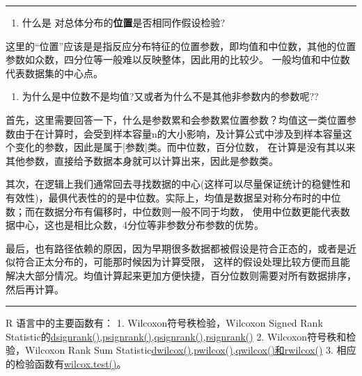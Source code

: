 \documentclass[
]{article}
\providecommand{\tightlist}{%
  \setlength{\itemsep}{0pt}\setlength{\parskip}{0pt}}
\begin{document}
\begin{center}\rule{0.5\linewidth}{0.5pt}\end{center}

\begin{enumerate}
\def\labelenumi{\arabic{enumi}.}
\tightlist
\item
  什么是 对总体分布的\textbf{位置}是否相同作假设检验?
\end{enumerate}

这里的``位置''应该是是指反应分布特征的位置参数，即均值和中位数，其他的位置参数如众数，四分位等一般难以反映整体，因此用的比较少。
一般均值和中位数代表数据集的中心点。

\begin{enumerate}
\def\labelenumi{\arabic{enumi}.}
\setcounter{enumi}{1}
\tightlist
\item
  为什么是中位数不是均值?又或者为什么不是其他非参数内的参数呢??
\end{enumerate}

首先，这里需要回答一下，什么是参数累和会参数累位置参数？均值这一类位置参数由于在计算时，会受到样本容量n的大小影响，及计算公式中涉及到样本容量这个变化的参数，因此是属于{[}参数{]}类。而中位数，百分位数，
在计算是没有其以来其他参数，直接给予数据本身就可以计算出来，因此是参数类。

其次，在逻辑上我们通常回去寻找数据的中心(这样可以尽量保证统计的稳健性和有效性)，最俱代表性的的是中位数。实际上，均值是数据呈对称分布时的中位数；而在数据分布有偏移时，中位数则一般不同于均数，
使用中位数更能代表数据中心，这也是相比众数，4分位等非参数分布参数的优势。

最后，也有路径依赖的原因，因为早期很多数据都被假设是符合正态的，或者是近似符合正太分布的，可能那时候因为计算受限，
这样的假设处理比较方便而且能解决大部分情况。均值计算起来更加方便快捷，百分位数则需要对所有数据排序，然后再计算。

\begin{center}\rule{0.5\linewidth}{0.5pt}\end{center}

R 语言中的主要函数有：
1. Wilcoxon符号秩检验，Wilcoxon Signed Rank Statistic的\href{https://www.rdocumentation.org/packages/stats/versions/3.6.2/topics/SignRank}{dsignrank(),psignrank(),qsignrank(),rsignrank()}
2. Wilcoxon符号秩和检验，Wilcoxon Rank Sum Statistic\href{https://www.rdocumentation.org/link/pwilcox?package=stats\&version=3.6.2}{dwilcox(),pwilcox(),qwilcox()和rwilcox()}
3. 相应的检验函数有\href{https://www.rdocumentation.org/packages/stats/versions/3.6.2/topics/wilcox.test}{wilcox.test()}。
\end{document}
